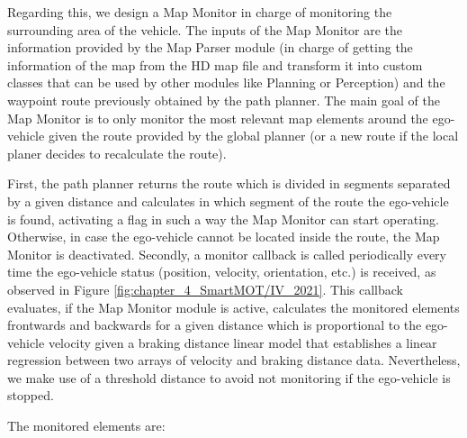 Regarding this, we design a Map Monitor in charge of monitoring the surrounding area of the vehicle. The inputs of the Map Monitor are the information provided by the Map Parser module (in charge of getting the information of the map from the HD map file and transform it into custom classes that can be used by other modules like Planning or Perception) and the waypoint route previously obtained by the path planner. The main goal of the Map Monitor is to only monitor the most relevant map elements around the ego-vehicle given the route provided by the global planner (or a new route if the local planer decides to recalculate the route). 

First, the path planner returns the route which is divided in segments separated by a given distance and calculates in which segment of the route the ego-vehicle is found, activating a flag in such a way the Map Monitor can start operating. Otherwise, in case the ego-vehicle cannot be located inside the route, the Map Monitor is deactivated. Secondly, a monitor callback is called periodically every time the ego-vehicle status (position, velocity, orientation, etc.) is received, as observed in Figure \ref{fig:chapter_4_SmartMOT/IV_2021}. This callback evaluates, if the Map Monitor module is active, calculates the monitored elements frontwards and backwards for a given distance which is proportional to the ego-vehicle velocity given a braking distance linear model that establishes a linear regression between two arrays of velocity and braking distance data. Nevertheless, we make use of a threshold distance to avoid not monitoring if the ego-vehicle is stopped. %

The monitored elements are:

